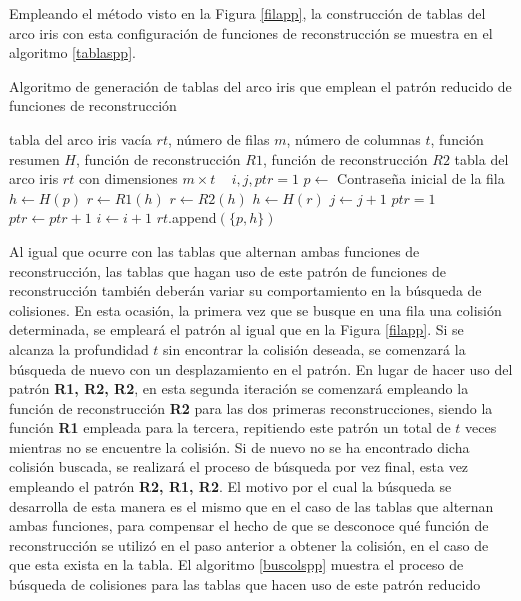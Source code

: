 \documentclass[12pt,spanish,listoffigures,listoftables,listofalgorithms]{tfgetsinf}
\begin{document}
Empleando el método visto en la Figura \ref{filapp}, la construcción de tablas del arco iris con esta configuración de funciones de reconstrucción se muestra en el algoritmo \ref{tablaspp}.

\begin{algorithm}[H]
	\caption{Algoritmo de generación de tablas del arco iris que emplean el patrón reducido de funciones de reconstrucción}
	\label{tablaspp}
	\begin{algorithmic}
		\REQUIRE tabla del arco iris vacía $rt$, número de filas $m$, número de columnas $t$, función resumen $H$, función de reconstrucción $R1$, función de reconstrucción $R2$
		\ENSURE tabla del arco iris $rt$ con dimensiones $m \times t$
		\STATE ~
		\STATE $i, j, ptr = 1$
			\STATE $p \leftarrow$ Contraseña inicial de la fila
			\STATE $h \leftarrow H(p)$
					\STATE $r \leftarrow R1(h)$
				\ELSE
					\STATE $r \leftarrow R2(h)$
				\ENDIF
				\STATE $h \leftarrow H(r)$
				\STATE $j \leftarrow j + 1$
					\STATE $ptr = 1$
				\ELSE
					\STATE $ptr \leftarrow ptr + 1$
				\ENDIF
			\ENDWHILE
			\STATE $i \leftarrow i + 1$
			\STATE $rt$.append$(\{p, h\})$
		\ENDWHILE
	\end{algorithmic}
\end{algorithm}

Al igual que ocurre con las tablas que alternan ambas funciones de reconstrucción, las tablas que hagan uso de este patrón de funciones de reconstrucción también deberán variar su comportamiento en la búsqueda de colisiones. En esta ocasión, la primera vez que se busque en una fila una colisión determinada, se empleará el patrón al igual que en la Figura \ref{filapp}. Si se alcanza la profundidad $t$ sin encontrar la colisión deseada, se comenzará la búsqueda de nuevo con un desplazamiento en el patrón. En lugar de hacer uso del patrón \textbf{R1, R2, R2}, en esta segunda iteración se comenzará empleando la función de reconstrucción \textbf{R2} para las dos primeras reconstrucciones, siendo la función \textbf{R1} empleada para la tercera, repitiendo este patrón un total de $t$ veces mientras no se encuentre la colisión. Si de nuevo no se ha encontrado dicha colisión buscada, se realizará el proceso de búsqueda por vez final, esta vez empleando el patrón \textbf{R2, R1, R2}. El motivo por el cual la búsqueda se desarrolla de esta manera es el mismo que en el caso de las tablas que alternan ambas funciones, para compensar el hecho de que se desconoce qué función de reconstrucción se utilizó en el paso anterior a obtener la colisión, en el caso de que esta exista en la tabla. El algoritmo \ref{buscolspp} muestra el proceso de búsqueda de colisiones para las tablas que hacen uso de este patrón reducido
\end{document}
